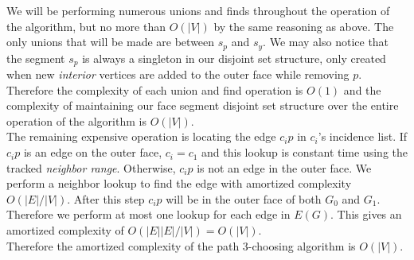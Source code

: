 \documentclass[11pt,letter]{article}
\begin{document}
\noindent We will be performing numerous unions and finds throughout the operation of the algorithm, but no more
than $O(|V|)$ by the same reasoning as above. The only unions that will be made are between $s_p$ and
$s_y$. We may also notice that the segment $s_p$ is always a singleton in our disjoint set structure, only created
when new \emph{interior} vertices are added to the outer face while removing $p$. Therefore the complexity of
each union and find operation is $O(1)$ and the complexity of maintaining our face segment 
disjoint set structure over the entire operation of the algorithm is $O(|V|)$.\\

\noindent The remaining expensive operation
is locating the edge $c_ip$ in $c_i$'s incidence list. If $c_ip$ is an edge on the outer face, $c_i=c_1$ and
this lookup is constant time using the tracked \emph{neighbor range}. Otherwise, $c_ip$ is not an edge in
the outer face. We perform a neighbor lookup to find the edge with amortized complexity $O(|E|/|V|)$.
After this step $c_ip$ will be in the outer face of both $G_0$ and $G_1$. Therefore we perform at most one lookup
for each edge in $E(G)$. This gives an amortized complexity of $O(|E||E|/|V|)=O(|V|)$.\\

\noindent Therefore the amortized complexity of the path $3$-choosing algorithm is $O(|V|)$.
\end{document}
